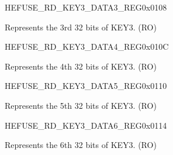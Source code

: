 \begin{register}{H}{EFUSE\_RD\_KEY3\_DATA3\_REG}{0x0108}\label{regdesc:EFUSERDKEY3DATA3REG}
%
\regnewline%
\begin{regdesc}\begin{reglist}
\label{fielddesc:EFUSEKEY3DATA3}\item [EFUSE\_KEY3\_DATA3] Represents the 3rd 32 bits of KEY3. (RO)
\end{reglist}\end{regdesc}
\end{register}


\begin{register}{H}{EFUSE\_RD\_KEY3\_DATA4\_REG}{0x010C}\label{regdesc:EFUSERDKEY3DATA4REG}
%
\regnewline%
\begin{regdesc}\begin{reglist}
\label{fielddesc:EFUSEKEY3DATA4}\item [EFUSE\_KEY3\_DATA4] Represents the 4th 32 bits of KEY3. (RO)
\end{reglist}\end{regdesc}
\end{register}


\begin{register}{H}{EFUSE\_RD\_KEY3\_DATA5\_REG}{0x0110}\label{regdesc:EFUSERDKEY3DATA5REG}
%
\regnewline%
\begin{regdesc}\begin{reglist}
\label{fielddesc:EFUSEKEY3DATA5}\item [EFUSE\_KEY3\_DATA5] Represents the 5th 32 bits of KEY3. (RO)
\end{reglist}\end{regdesc}
\end{register}


\begin{register}{H}{EFUSE\_RD\_KEY3\_DATA6\_REG}{0x0114}\label{regdesc:EFUSERDKEY3DATA6REG}
%
\regnewline%
\begin{regdesc}\begin{reglist}
\label{fielddesc:EFUSEKEY3DATA6}\item [EFUSE\_KEY3\_DATA6] Represents the 6th 32 bits of KEY3. (RO)
\end{reglist}\end{regdesc}
\end{register}



